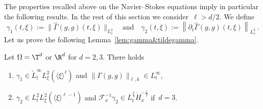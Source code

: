 
The properties recalled above on the Navier--Stokes equations imply in particular the following results. In the rest of this section we consider~$\ell>d/2$. We define
\[
\gamma_1(t,\xi):=\big\| \widehat {\Gamma}(g,g)({t},\xi)\big\|_{L^2_v}\quad \text{and} \quad {\gamma_2}({t},\xi) := \left\| \partial_{t} \widehat {\Gamma}(g,g)(t,\xi) \right\|_{L^2_v} \,.
\]
Let us prove the following Lemma~\ref{lem:gamma&tildegamma}.

\begin{lemm}\label{lem:gamma&tildegamma}
Let $\Omega= \T^d$ or $\R^d$ for $d= 2,3$. There holds 
\begin{enumerate}\romanenumi
\item \label{listlemmB7.1}$ \gamma_1 \in \tilde L^\infty_tL^2_\xi(\langle \xi \rangle^\ell) $ and $\|\Gamma(g,g)\|_{\ell,k} \in L^\infty_t$,
\item \label{listlemmB7.2}$\gamma_2\in L^2_t L^2_\xi(\langle \xi \rangle^{\ell-1})$ and $\mathcal{F}_x^{-1} \gamma_2 \in L^\frac43_{t} \dot H^{-\frac12}_{x}$ if~$d=3$.
\end{enumerate}

\end{lemm}
